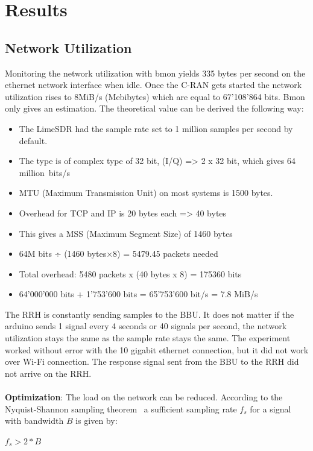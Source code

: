 \section{Results}
\subsection{Network Utilization}
Monitoring the network utilization with bmon yields 
335 bytes per second on the ethernet network interface when idle. Once the C-RAN gets started the network
utilization rises to 8MiB/s (Mebibytes) which are equal to 67’108’864 bits.
Bmon only gives an estimation. The theoretical value can be derived the following way:
\\
\begin{itemize}
    \item The LimeSDR had the sample rate set to 1 million samples per second by default.
    \item The type is of complex type of 32 bit, (I/Q) => 2 x 32 bit, which gives 64 million~bits/s
    \item MTU (Maximum Transmission Unit) on most systems is 1500 bytes.
    \item Overhead for TCP and IP is 20 bytes each => 40 bytes
    \item This gives a MSS (Maximum Segment Size) of 1460 bytes
    \item 64M bits ÷ (1460 bytes×8) = 5479.45 packets needed
    \item Total overhead: 5480 packets x (40 bytes x 8) = 175360 bits
    \item 64’000’000 bits + 1’753’600 bits = 65’753’600 bit/s = 7.8 MiB/s
\end{itemize}

The RRH is constantly sending samples to the BBU. It does not matter if the arduino 
sends 1 signal every 4 seconds or 40 signals per second, the network utilization stays the same
as the sample rate stays the same. The experiment worked without error with the 
10 gigabit ethernet connection, but it did not work over Wi-Fi connection.
The response signal sent from the BBU to the RRH did not arrive on the RRH.
\\
\\
\textbf{Optimization}: The load on the network can be reduced. According to the Nyquist-Shannon sampling theorem~\cite{Shannon1949}
a sufficient sampling rate $f_{s}$ for a signal with bandwidth $B$ is given by:
\begin{center}
    $f_{s} > 2*B$  
\end{center}

